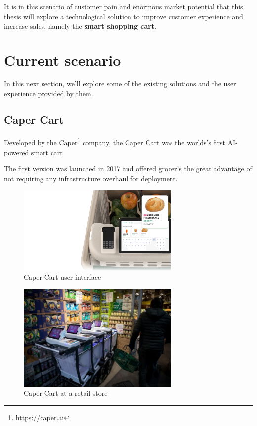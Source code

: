\documentclass[openright]{normas-utf-tex} %
\begin{document}
It is in this scenario of customer pain and enormous market potential that this
thesis will explore a technological solution to improve customer experience and increase sales,
namely the \textbf{smart shopping cart}.

\section{Current scenario}

In this next section, we'll explore some of the existing solutions and the user experience
provided by them.

\subsection{Caper Cart}

Developed by the Caper\footnote{https://caper.ai} company, the Caper Cart was the worlds's first AI-powered smart cart \cite{Caper2020}

The first version was launched in 2017 and offered grocer's the
great advantage of not requiring any infrastructure overhaul for deployment.

\begin{figure}[H]
	\centering
	\includegraphics[width=0.7\textwidth]{./images/capercartui.png}
	\caption[Caper Cart user interface]{Caper Cart user interface}
	\label{fig:caperui}
\end{figure}

\begin{figure}[H]
	\centering
	\includegraphics[width=0.7\textwidth]{./images/caper.png}
	\caption[Caper Cart at a retail store]{Caper Cart at a retail store}
	\label{fig:caperatretail}
\end{figure}
\end{document}
